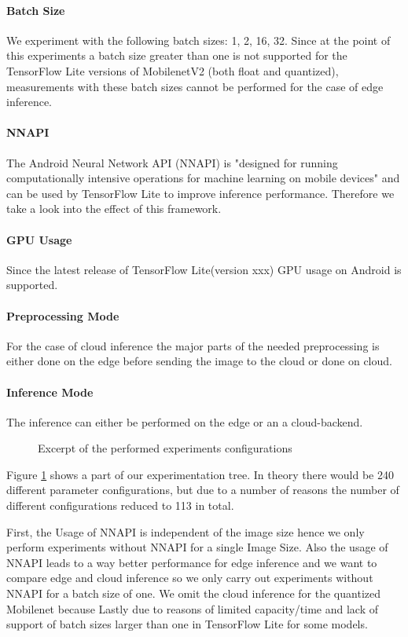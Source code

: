 \paragraph{Batch Size}
We experiment with the following batch sizes: 1, 2, 16, 32. Since at the point of this experiments a batch size greater than one is not supported for the TensorFlow Lite versions of MobilenetV2 (both float and quantized), measurements with these batch sizes cannot be performed for the case of edge inference.
\paragraph{NNAPI}
The Android Neural Network API (NNAPI)
is "designed for running computationally intensive operations for machine learning on mobile devices" \cite{NNAPI} and can be used by TensorFlow Lite to improve inference performance. Therefore we take a look into the effect of this framework.
\paragraph{GPU Usage}
Since the latest release of TensorFlow Lite(version xxx) GPU usage on Android is supported. 
\paragraph{Preprocessing Mode}
For the case of cloud inference the major parts of the needed preprocessing is either done on the edge before sending the image to the cloud or done on cloud.
\paragraph{Inference Mode}
The inference can either be performed on the edge or an a cloud-backend.


\begin{figure}[H]
\centering
 \scalebox{.7}{}

\caption{Excerpt of the performed experiments configurations}
\label{fig:tree}
\end{figure}
Figure \ref{fig:tree} shows a part of our experimentation tree. In theory there would be 240 different parameter configurations, but due to a number of reasons the number of different configurations reduced to 113 in total.

First, the Usage of NNAPI is independent of the image size hence we only perform experiments without NNAPI for a single Image Size. Also the usage of NNAPI leads to a way better performance for edge inference and we want to compare edge and cloud inference so we only carry out experiments without NNAPI for a batch size of one.
We omit the cloud inference for the quantized Mobilenet because %
Lastly due to reasons of limited capacity/time and lack of support of batch sizes larger than one in TensorFlow Lite for some models.
